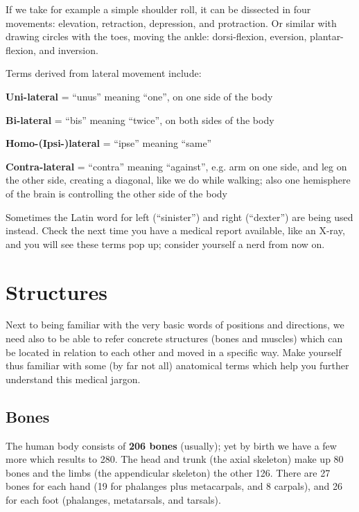 If we take for example a simple shoulder roll, it can be dissected in four movements: elevation, retraction, depression, and protraction.
Or similar with drawing circles with the toes, moving the ankle: dorsi-flexion, eversion, plantar-flexion, and inversion.

Terms derived from lateral movement include:

\begin{itemize*}
    \item \textbf{Uni-lateral} = ``unus'' meaning ``one'', on one side of the body
    \item \textbf{Bi-lateral} = ``bis'' meaning ``twice'', on both sides of the body
    \item \textbf{Homo-(Ipsi-)lateral} = ``ipse'' meaning ``same''
    \item \textbf{Contra-lateral} = ``contra'' meaning ``against'', e.g. arm on one side, and leg on the other side, creating a diagonal, like we do while walking; also one hemisphere of the brain is controlling the other side of the body
\end{itemize*}

Sometimes the Latin word for left (``sinister'') and right (``dexter'') are being used instead.
Check the next time you have a medical report available, like an X-ray, and you will see these terms pop up; consider yourself a nerd from now on.

\section{Structures}\label{sec:structures}

Next to being familiar with the very basic words of positions and directions, we need also to be able to refer concrete structures (bones and muscles) which can be located in relation to each other and moved in a specific way.
Make yourself thus familiar with some (by far not all) anatomical terms which help you further understand this medical jargon.

\subsection{Bones}\label{subsec:bones}

The human body consists of \textbf{206 bones} (usually); yet by birth we have a few more which results to 280.
The head and trunk (the axial skeleton) make up 80 bones and the limbs (the appendicular skeleton) the other 126.
There are 27 bones for each hand (19 for phalanges plus metacarpals, and 8 carpals), and 26 for each foot (phalanges, metatarsals, and tarsals).

